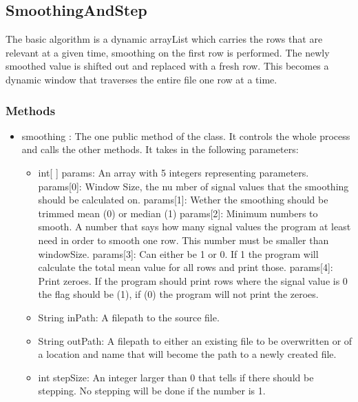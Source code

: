 
\subsection{SmoothingAndStep}

The basic algorithm is a dynamic arrayList which carries the rows that are relevant at a given time, smoothing on the first row is performed. The newly smoothed value is shifted out and replaced with a fresh row. This becomes a dynamic window that traverses the entire file one row at a time.

\subsubsection{Methods}

\begin{itemize} 
\item smoothing : The one public method of the class. It controls the whole process and calls the other methods. It takes in the following parameters:
\begin{itemize}
\item int[ ] params: An array with 5 integers representing parameters.
     params[0]: Window Size, the nu 
mber of signal values that the smoothing
      		  should be calculated on. \newline
      params[1]: Wether the smoothing should be trimmed mean (0) or median (1)\newline
      params[2]: Minimum numbers to smooth. A number that says how many signal
      		  values the program at least need in order to smooth one row.
      		  This number must be smaller than windowSize. \newline
      params[3]: Can either be 1 or 0. If 1 the program will calculate the
      		  total mean value for all rows and print those. \newline
      params[4]: Print zeroes. If the program should print rows where the
      		  signal value is 0 the flag should be (1), if (0) the program
      		  will not print the zeroes. \newline
\item String inPath: A filepath to the source file.
\item String outPath: A filepath to either an existing file to be overwritten or of a location and name that will become the path to a newly created file.
\item int stepSize:  An integer larger than 0 that tells if there should be stepping. No stepping will be done if the number is 1.
\end{itemize}


\end{itemize}
